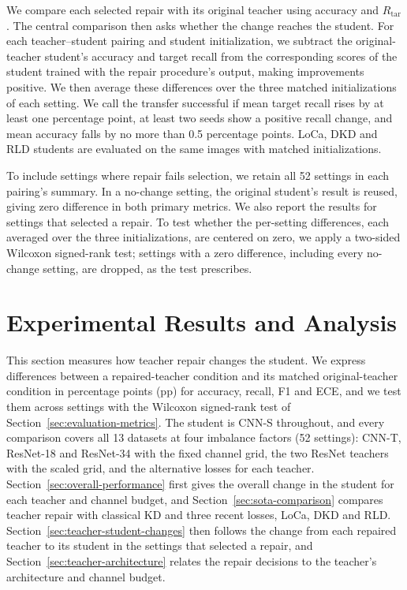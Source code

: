 \documentclass[review,number,sort&compress]{elsarticle}
\theoremstyle{definition}
\begin{document}
We compare each selected repair with its original teacher using
accuracy and $R_{\mathrm{tar}}$. The central comparison then asks
whether the change reaches the student. For each teacher--student
pairing and student initialization, we subtract the original-teacher
student's accuracy and target recall from the corresponding scores of
the student trained with the repair procedure's output, making
improvements positive. We then average these differences over the
three matched initializations of each setting. We call the transfer
successful if mean target recall rises by at least one percentage
point, at least two seeds show a positive recall change, and mean
accuracy falls by no more than 0.5 percentage points. LoCa, DKD and
RLD students are evaluated on the same images with matched
initializations.

To include settings where repair fails selection, we retain all 52
settings in each pairing's summary. In a no-change setting, the
original student's result is reused, giving zero difference in both
primary metrics. We also report the results for settings that selected
a repair. To test whether the per-setting differences, each averaged
over the three initializations, are centered on zero, we apply a
two-sided Wilcoxon signed-rank test; settings with a zero difference,
including every no-change setting, are dropped, as the test prescribes.

\FloatBarrier
\section{Experimental Results and Analysis}
\label{sec:results}

This section measures how teacher repair changes the student. We
express differences between a repaired-teacher condition and its
matched original-teacher condition in percentage points (pp) for
accuracy, recall, F1 and ECE, and we test them across settings with the
Wilcoxon signed-rank test of Section~\ref{sec:evaluation-metrics}. The
student is CNN-S throughout, and every comparison covers all 13
datasets at four imbalance factors (52 settings): CNN-T, ResNet-18 and
ResNet-34 with the fixed channel grid, the two ResNet teachers with the
scaled grid, and the alternative losses for each teacher.
Section~\ref{sec:overall-performance} first gives the overall change in
the student for each teacher and channel budget, and
Section~\ref{sec:sota-comparison} compares teacher repair with
classical KD and three recent losses, LoCa, DKD and RLD.
Section~\ref{sec:teacher-student-changes} then follows the change from
each repaired teacher to its student in the settings that selected a
repair, and Section~\ref{sec:teacher-architecture} relates the repair
decisions to the teacher's architecture and channel budget.
\end{document}
